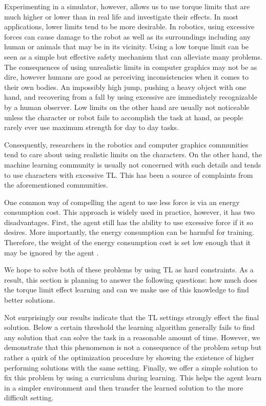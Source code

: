Experimenting in a simulator, however, allows us to use torque limits that are much higher or lower than in real life and investigate their effects. In most applications, lower limits tend to be more desirable. In robotics, using excessive forces can cause damage to the robot as well as its surroundings including any human or animals that may be in its vicinity. Using a low torque limit can be seen as a simple but effective safety mechanism that can alleviate many problems. The consequences of using unrealistic limits in computer graphics may not be as dire, however humans are good as perceiving inconsistencies when it comes to their own bodies. An impossibly high jump, pushing a heavy object with one hand, and recovering from a fall by using excessive are immediately recognizable by a human observer. Low limits on the other hand are usually not noticeable unless the character or robot fails to accomplish the task at hand, as people rarely ever use maximum strength for day to day tasks.

Consequently, researchers in the robotics and computer graphics communities tend to care about using realistic limits on the characters. On the other hand, the machine learning community is usually not concerned with such details and tends to use characters with excessive \ac{TL}. This has been a source of complaints from the aforementioned communities.

One common way of compelling the agent to use less force is via an energy consumption cost. This approach is widely used in practice, however, it has two disadvantages. First, the agent still has the ability to use excessive force if it so desires. More importantly, the energy consumption can be harmful for training. Therefore, the weight of the energy consumption cost is set low enough that it may be ignored by the agent \cite{Yu-SIGGRAPH-2018}.

We hope to solve both of these problems by using \ac{TL} as hard constraints. As a result, this section is planning to answer the following questions: how much does the torque limit effect learning and can we make use of this knowledge to find better solutions.

Not surprisingly our results indicate that the \ac{TL} settings strongly effect the final solution. Below a certain threshold the learning algorithm generally fails to find any solution that can solve the task in a reasonable amount of time. However, we demonstrate that this phenomenon is not a consequence of the problem setup but rather a quirk of the optimization procedure by showing the existence of higher performing solutions with the same setting. Finally, we offer a simple solution to fix this problem by using a curriculum during learning. This helps the agent learn in a simpler environment and then transfer the learned solution to the more difficult setting.

